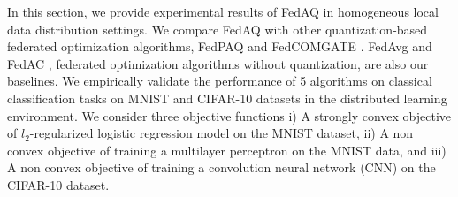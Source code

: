 \documentclass[11pt]{article}
\begin{document}
In this section, we provide experimental results of FedAQ in homogeneous local data distribution settings. We compare FedAQ with other quantization-based federated optimization algorithms, FedPAQ \cite{Yeojoon-reisizadeh2020fedpaq} and FedCOMGATE \cite{Yeojoon-haddadpour2021federated}. FedAvg \cite{Yeojoon-mcmahan2017communication} and FedAC \cite{Yeojoon-yuan2020federated}, federated optimization algorithms without quantization, are also our baselines. We empirically validate the performance of 5 algorithms on classical classification tasks on MNIST\cite{Yeojoon-lecun1998mnist} and CIFAR-10\cite{Yeojoon-krizhevsky2009learning} datasets in the distributed learning environment. We consider three objective functions i) A strongly convex objective of $l_2$-regularized logistic regression model on the MNIST dataset, ii) A non convex objective of training a multilayer perceptron on the MNIST data, and iii) A non convex objective of training a convolution neural network (CNN) on the CIFAR-10 dataset. %

\end{document}
